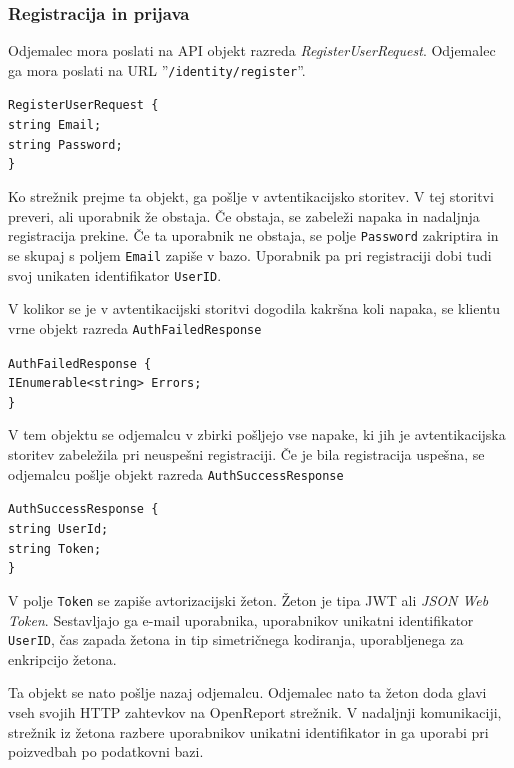 \documentclass[a4paper, 12pt]{book}
\begin{document}
\subsubsection{Registracija in prijava}

Odjemalec mora poslati na API objekt razreda \textit{RegisterUserRequest}.
Odjemalec ga mora poslati na URL ''\texttt{/identity/register}''.

\noindent \texttt{RegisterUserRequest \{ \\
	string Email; \\
	string Password; \\
\} }

Ko strežnik prejme ta objekt, ga pošlje v avtentikacijsko storitev.
V tej storitvi preveri, ali uporabnik že obstaja.
Če obstaja, se zabeleži napaka in nadaljnja registracija prekine.
Če ta uporabnik ne obstaja, se polje \texttt{Password} zakriptira in se skupaj s poljem \texttt{Email} zapiše v bazo.
Uporabnik pa pri registraciji dobi tudi svoj unikaten identifikator \texttt{UserID}.

V kolikor se je v avtentikacijski storitvi dogodila kakršna koli napaka, se klientu vrne objekt razreda \texttt{AuthFailedResponse}

\noindent \texttt{AuthFailedResponse \{ \\
  IEnumerable<string> Errors; \\
\} }

\noindent V tem objektu se odjemalcu v zbirki pošljejo vse napake, ki jih je avtentikacijska storitev zabeležila pri neuspešni registraciji.  Če je bila registracija uspešna, se odjemalcu pošlje objekt razreda \texttt{AuthSuccessResponse}

\noindent \texttt{AuthSuccessResponse \{ \\
  string UserId; \\
  string Token; \\
\} }

\noindent V polje \texttt{Token} se zapiše avtorizacijski žeton.
Žeton je tipa JWT ali \textit{JSON Web Token}.
Sestavljajo ga e-mail uporabnika, uporabnikov unikatni identifikator \texttt{UserID}, čas zapada žetona in tip simetričnega kodiranja, uporabljenega za enkripcijo žetona.

Ta objekt se nato pošlje nazaj odjemalcu.
Odjemalec nato ta žeton doda glavi vseh svojih HTTP zahtevkov na OpenReport strežnik.
V nadaljnji komunikaciji, strežnik iz žetona razbere uporabnikov unikatni identifikator in ga uporabi pri poizvedbah po podatkovni bazi.
\end{document}
